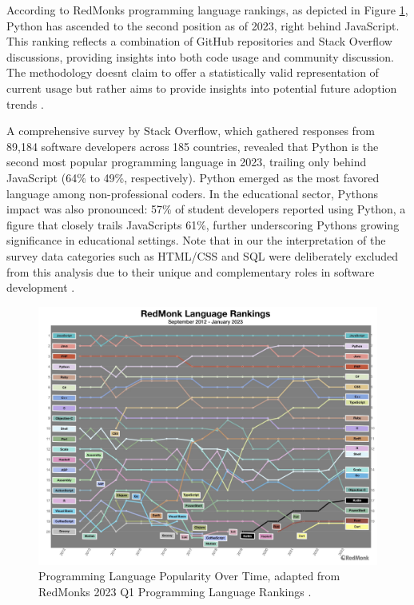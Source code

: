 According to RedMonk\textquotesingle s programming language rankings, as
depicted in Figure \ref{fig:prog_lang}, Python has ascended to the second position as of
2023, right behind JavaScript. This ranking reflects a combination of
GitHub repositories and Stack Overflow discussions, providing insights
into both code usage and community discussion. The methodology
doesn\textquotesingle t claim to offer a statistically valid
representation of current usage but rather aims to provide insights into
potential future adoption trends
\cite{33}.

A comprehensive survey by Stack Overflow, which gathered responses from
89,184 software developers across 185 countries, revealed that Python is
the second most popular programming language in 2023, trailing only
behind JavaScript (64\% to 49\%, respectively). Python emerged as the
most favored language among non-professional coders. In the educational
sector, Python\textquotesingle s impact was also pronounced: 57\% of
student developers reported using Python, a figure that closely trails
JavaScript\textquotesingle s 61\%, further underscoring
Python\textquotesingle s growing significance in educational settings.
Note that in our the interpretation of the survey data categories such
as HTML/CSS and SQL were deliberately excluded from this analysis due to
their unique and complementary roles in software development
\cite{34}.

\begin{figure}[ht]
  \centering
  \includegraphics[width=\textwidth]{media/fig1.jpg}
  \caption{Programming Language Popularity Over Time, adapted from
  RedMonk\textquotesingle s 2023 Q1 Programming Language Rankings
  \cite{33}.}
  \label{fig:prog_lang}
\end{figure}

